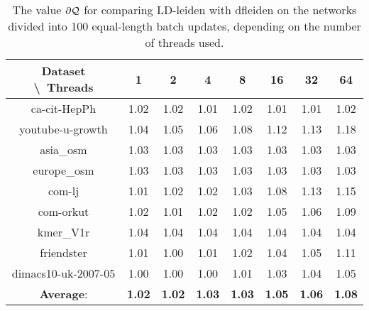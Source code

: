 \begin{table}[H]
	\centering
	\begin{tabular}{|c|c|c|c|c|c|c|c|}
		\hline
		Dataset \textbackslash\ Threads & 1 & 2 & 4 & 8 & 16 & 32 & 64 \\
		\hline
		ca-cit-HepPh & 1.02 & 1.02 & 1.01 & 1.02 & 1.01 & 1.01 & 1.02 \\
		\hline
		youtube-u-growth & 1.04 & 1.05 & 1.06 & 1.08 & 1.12 & 1.13 & 1.18 \\
		\hline
		asia\_osm & 1.03 & 1.03 & 1.03 & 1.03 & 1.03 & 1.03 & 1.03 \\
		\hline
		europe\_osm & 1.03 & 1.03 & 1.03 & 1.03 & 1.03 & 1.03 & 1.03 \\
		\hline
		com-lj & 1.01 & 1.02 & 1.02 & 1.03 & 1.08 & 1.13 & 1.15 \\
		\hline
		com-orkut & 1.02 & 1.01 & 1.02 & 1.02 & 1.05 & 1.06 & 1.09 \\
		\hline
		kmer\_V1r & 1.04 & 1.04 & 1.04 & 1.04 & 1.04 & 1.04 & 1.04 \\
		\hline
		friendster & 1.01 & 1.00 & 1.01 & 1.02 & 1.04 & 1.05 & 1.11 \\
		\hline
		dimacs10-uk-2007-05 & 1.00 & 1.00 & 1.00 & 1.01 & 1.03 & 1.04 & 1.05 \\
		\hline
		\textbf{Average}: & \textbf{1.02} & \textbf{1.02} & \textbf{1.03} & \textbf{1.03} & \textbf{1.05} & \textbf{1.06} & \textbf{1.08} \\
		\hline
	\end{tabular}
\caption{The value $\partial\mathcal{Q}$ for comparing LD-leiden with dfleiden on the networks divided into 100 equal-length batch updates, depending on the number of threads used.}
\label{T:scalling:lastM:100:LD-leiden to dfleiden}
\end{table}